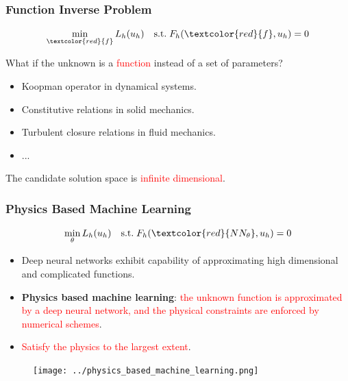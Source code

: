 \documentclass{beamer}
\begin{document}
\begin{frame}
	\frametitle{Function Inverse Problem}
	
	\begin{equation*}
		\min_{\textcolor{red}{f}} L_h(u_h) \quad \mathrm{s.t.}\; F_h(\textcolor{red}{f}, u_h) = 0
	\end{equation*}
	
	What if the unknown is a \textcolor{red}{function} instead of a set of parameters?
\begin{itemize}
	\item Koopman operator in dynamical systems.
	\item Constitutive relations in solid mechanics. 
	\item Turbulent closure relations in fluid mechanics.
	\item ...
\end{itemize}

The candidate solution space is \textcolor{red}{infinite dimensional}.

\end{frame}

\begin{frame}
	\frametitle{Physics Based Machine Learning}
	$$\min_{\theta} L_h(u_h) \quad \mathrm{s.t.}\;F_h(\textcolor{red}{NN_\theta}, u_h) = 0$$
	\vspace{-0.5cm}
	\begin{itemize}
		\item Deep neural networks exhibit capability of approximating high dimensional and complicated functions. 
		\item \textbf{Physics based machine learning}: \textcolor{red}{the unknown function is approximated by a deep neural network, and the physical constraints are enforced by numerical schemes}.
		\item \textcolor{red}{Satisfy the physics to the largest extent}.
	\end{itemize}
	\begin{figure}[hbt]
  \texttt{[image: ../physics\_based\_machine\_learning.png]}
\end{figure}
\end{frame}
\end{document}
